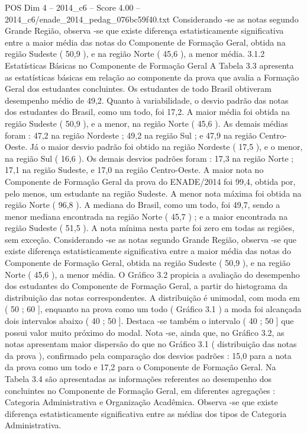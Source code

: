 \begin{textsample}{POS Dim 4 – 2014\_c6 – Score 4.00 – 2014\_c6/enade\_2014\_pedag\_076bc59f40.txt}
Considerando -se as notas segundo Grande Região, observa -se que existe diferença estatisticamente significativa entre a maior média das notas do Componente de Formação Geral, obtida na região Sudeste ( 50,9 ), e na região Norte ( 45,6 ), a menor média. 3.1.2 Estatísticas Básicas no Componente de Formação Geral A Tabela 3.3 apresenta as estatísticas básicas em relação ao componente da prova que avalia a Formação Geral dos estudantes concluintes.
Os estudantes de todo Brasil obtiveram desempenho médio de 49,2.
Quanto à variabilidade, o desvio padrão das notas dos estudantes do Brasil, como um todo, foi 17,2.
A maior média foi obtida na região Sudeste ( 50,9 ), e a menor, na região Norte ( 45,6 ).
As demais médias foram : 47,2 na região Nordeste ; 49,2 na região Sul ; e 47,9 na região Centro-Oeste.
Já o maior desvio padrão foi obtido na região Nordeste ( 17,5 ), e o menor, na região Sul ( 16,6 ).
Os demais desvios padrões foram : 17,3 na região Norte ; 17,1 na região Sudeste, e 17,0 na região Centro-Oeste.
A maior nota no Componente de Formação Geral da prova do ENADE/2014 foi 99,4, obtida por, pelo menos, um estudante na região Sudeste.
A menor nota máxima foi obtida na região Norte ( 96,8 ).
A mediana do Brasil, como um todo, foi 49,7, sendo a menor mediana encontrada na região Norte ( 45,7 ) ; e a maior encontrada na região Sudeste ( 51,5 ).
A nota mínima nesta parte foi zero em todas as regiões, sem exceção.
Considerando -se as notas segundo Grande Região, observa -se que existe diferença estatisticamente significativa entre a maior média das notas do Componente de Formação Geral, obtida na região Sudeste ( 50,9 ), e na região Norte ( 45,6 ), a menor média.
O Gráfico 3.2 propicia a avaliação do desempenho dos estudantes do Componente de Formação Geral, a partir do histograma da distribuição das notas correspondentes.
A distribuição é unimodal, com moda em ( 50 ; 60 ], enquanto na prova como um todo ( Gráfico 3.1 ) a moda foi alcançada dois intervalos abaixo ( 40 ; 50 ].
Destaca -se também o intervalo ( 40 ; 50 ] que possui valor muito próximo do modal.
Nota -se, ainda que, no Gráfico 3.2, as notas apresentam maior dispersão do que no Gráfico 3.1 ( distribuição das notas da prova ), confirmado pela comparação dos desvios padrões : 15,0 para a nota da prova como um todo e 17,2 para o Componente de Formação Geral.
Na Tabela 3.4 são apresentadas as informações referentes ao desempenho dos concluintes no Componente de Formação Geral, em diferentes agregações : Categoria Administrativa e Organização Acadêmica.
Observa -se que existe diferença estatisticamente significativa entre as médias dos tipos de Categoria Administrativa.

\end{textsample}
